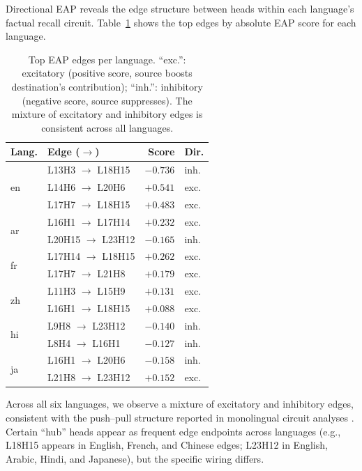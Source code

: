 \documentclass[11pt]{article}
\begin{document}
Directional EAP reveals the edge structure between heads within each language's factual recall circuit.
Table~\ref{tab:eap} shows the top edges by absolute EAP score for each language.

\begin{table}[t]
\centering
\small
\begin{tabular}{llrl}
\toprule
\textbf{Lang.} & \textbf{Edge ($\to$)} & \textbf{Score} & \textbf{Dir.} \\
\midrule
\multirow{3}{*}{en} & L13H3 $\to$ L18H15 & $-0.736$ & inh. \\
 & L14H6 $\to$ L20H6 & $+0.541$ & exc. \\
 & L17H7 $\to$ L18H15 & $+0.483$ & exc. \\
\midrule
\multirow{2}{*}{ar} & L16H1 $\to$ L17H14 & $+0.232$ & exc. \\
 & L20H15 $\to$ L23H12 & $-0.165$ & inh. \\
\midrule
\multirow{2}{*}{fr} & L17H14 $\to$ L18H15 & $+0.262$ & exc. \\
 & L17H7 $\to$ L21H8 & $+0.179$ & exc. \\
\midrule
\multirow{2}{*}{zh} & L11H3 $\to$ L15H9 & $+0.131$ & exc. \\
 & L16H1 $\to$ L18H15 & $+0.088$ & exc. \\
\midrule
\multirow{2}{*}{hi} & L9H8 $\to$ L23H12 & $-0.140$ & inh. \\
 & L8H4 $\to$ L16H1 & $-0.127$ & inh. \\
\midrule
\multirow{2}{*}{ja} & L16H1 $\to$ L20H6 & $-0.158$ & inh. \\
 & L21H8 $\to$ L23H12 & $+0.152$ & exc. \\
\bottomrule
\end{tabular}
\caption{Top EAP edges per language. ``exc.'': excitatory (positive score, source boosts destination's contribution); ``inh.'': inhibitory (negative score, source suppresses). The mixture of excitatory and inhibitory edges is consistent across all languages.}
\label{tab:eap}
\end{table}

Across all six languages, we observe a mixture of excitatory and inhibitory edges, consistent with the push--pull structure reported in monolingual circuit analyses \cite{elhage2021mathematical, anthropic2025biology}.
Certain ``hub'' heads appear as frequent edge endpoints across languages (e.g., L18H15 appears in English, French, and Chinese edges; L23H12 in English, Arabic, Hindi, and Japanese), but the specific wiring differs.
\end{document}
